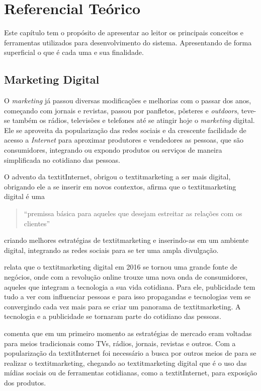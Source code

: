 \chapter[Referencial Teórico]{Referencial Teórico}
Este capítulo tem o propósito de apresentar ao leitor os principais conceitos e ferramentas utilizados para desenvolvimento do sistema. Apresentando de forma superficial o que é cada uma e sua finalidade. 

\section{Marketing Digital}
O \textit{marketing} já passou diversas modificações e melhorias com o passar dos anos, começando com jornais e revistas, passou por panfletos, pôsteres e \textit{outdoors}, teve-se também os rádios, televisões e telefones até se atingir hoje o \textit{marketing} digital. Ele se aproveita da popularização das redes sociais e da crescente facilidade de acesso a \textit{Internet} para aproximar produtores e vendedores as pessoas, que são consumidores, integrando ou expondo produtos ou serviços de maneira simplificada no cotidiano das pessoas.

O advento da textit{Internet}, obrigou o textit{marketing} a ser mais digital, obrigando ele a se inserir em novos contextos, \cite{canto2017} afirma que o textit{marketing} digital é uma \begin{quote} ``premissa básica para aqueles que desejam estreitar as relações com os clientes''\end{quote} criando melhores estratégias de textit{marketing} e inserindo-as em um ambiente digital, integrando as redes sociais para se ter uma ampla divulgação.

\cite[p.2]{ryan2016} relata que o textit{marketing} digital em 2016 se tornou uma grande fonte de negócios, onde com a revolução online trouxe uma nova onda de consumidores, aqueles que integram a tecnologia a sua vida cotidiana. Para ele, publicidade tem tudo a ver com influenciar pessoas e para isso propagandas e tecnologias vem se convergindo cada vez mais para se criar um panorama de textit{marketing}. A tecnologia e a publicidade se tornaram parte do cotidiano das pessoas.

\cite{santos2014} comenta que em um primeiro momento as estratégias de mercado eram voltadas para meios tradicionais como TVs, rádios, jornais, revistas e outros. Com a popularização da textit{Internet} foi necessário a busca por outros meios de para se realizar
o textit{marketing}, chegando ao textit{marketing} digital que é o uso das mídias sociais ou de ferramentas cotidianas, como a textit{Internet}, para exposição dos produtos.

